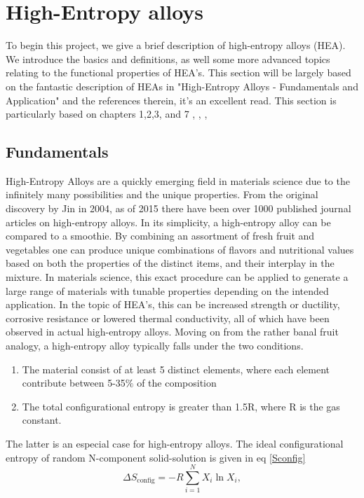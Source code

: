 \chapter{High-Entropy alloys}
\label{sec:HEA}

To begin this project, we give a brief description of high-entropy alloys (HEA). We introduce the basics and definitions, as well some more advanced topics relating to the functional properties of HEA's. This section will be largely based on the fantastic description of HEAs in "High-Entropy Alloys - Fundamentals and Application" and the references therein, it's an excellent read. This section is particularly based on chapters 1,2,3, and 7 \cite{hea2016_ch1}, \cite{hea2016_ch2}, \cite{hea2016_ch3}, \cite{hea2016_ch7} 

\section{Fundamentals}
High-Entropy Alloys are a quickly emerging field in materials science due to the infinitely many possibilities and the unique properties. From the original discovery by Jin in 2004, as of 2015 there have been over 1000 published journal articles on high-entropy alloys. 
In its simplicity, a high-entropy alloy can be compared to a smoothie. By combining an assortment of fresh fruit and vegetables one can produce unique combinations of flavors and nutritional values based on both the properties of the distinct items, and their interplay in the mixture. In materials science, this exact procedure can be applied to generate a large range of materials with tunable properties depending on the intended application. In the topic of HEA's, this can be increased strength or ductility, corrosive resistance or lowered thermal conductivity, all of which have been observed in actual high-entropy alloys. 
Moving on from the rather banal fruit analogy, a high-entropy alloy typically falls under the two conditions.
\begin{enumerate}
    \item The material consist of at least 5 distinct elements, where each element contribute between 5-35$\%$ of the composition
    \item The total configurational entropy is greater than 1.5R, where R is the gas constant. 
\end{enumerate}
The latter is an especial case for high-entropy alloys. The ideal configurational entropy of random N-component solid-solution is given in eq \ref{Sconfig}
\begin{equation}
\Delta S_{\text{config}} = -R \sum_{i=1}^{N}X_i\ln X_i, \label{Sconfig}
\end{equation}
